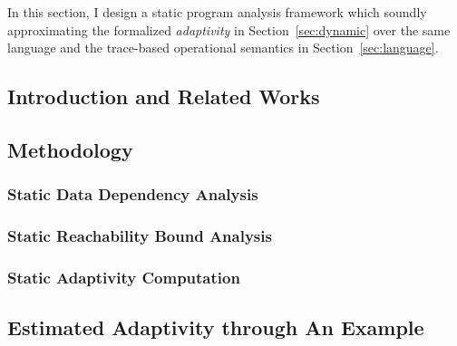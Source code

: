 In this section, I design a static program analysis framework which soundly approximating the formalized 
\emph{adaptivity} in Section~\ref{sec:dynamic} 
over the same language and the trace-based operational semantics in Section~\ref{sec:language}.
\subsection{Introduction and Related Works}
\label{subsec:static-intro}


\subsection{Methodology}
\label{subsec:static-methodology}



\subsubsection{Static Data Dependency Analysis}
\label{subsubsec:static-datadep}


\subsubsection{Static Reachability Bound Analysis}
\label{subsubsec:static-reachability}


\subsubsection{Static Adaptivity Computation}
\label{subsubsec:static-adapt}


\subsection{Estimated Adaptivity through An Example}
\label{subsec:static-examples}
% 

%
